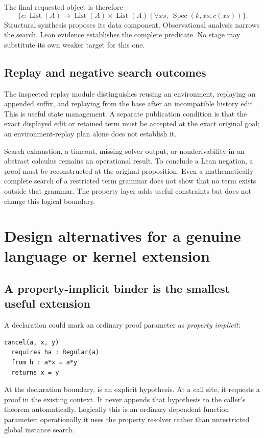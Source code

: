 \documentclass[11pt,a4paper]{article}
\newcommand{\code}[1]{\texttt{\detokenize{#1}}}
\newcommand{\Spec}{\operatorname{Spec}}
\theoremstyle{plain}
\theoremstyle{definition}
\begin{document}
The final requested object is therefore
\[
 \{c:\operatorname{List}(A)\to
       \operatorname{List}(A)\times\operatorname{List}(A)
     \mid \forall xs,\ \Spec(k,xs,c(xs))\}.
\]
Structural synthesis proposes its data component. Observational analysis narrows the search. Lean evidence establishes the complete predicate. No stage may substitute its own weaker target for this one.

\subsection{Replay and negative search outcomes}
The inspected replay module distinguishes reusing an environment, replaying an appended suffix, and replaying from the base after an incompatible history edit \cite{leant-replay}. This is useful state management. A separate publication condition is that the exact displayed edit or retained term must be accepted at the exact original goal; an environment-replay plan alone does not establish it.

Search exhaustion, a timeout, missing solver output, or nonderivability in an abstract calculus remains an operational result. To conclude a Lean negation, a proof must be reconstructed at the original proposition. Even a mathematically complete search of a restricted term grammar does not show that no term exists outside that grammar. The property layer adds useful constraints but does not change this logical boundary.

\section{Design alternatives for a genuine language or kernel extension}\label{sec:extensions}

\subsection{A property-implicit binder is the smallest useful extension}
A declaration could mark an ordinary proof parameter as \emph{property implicit}:
\par\noindent\begin{minipage}{\linewidth}
\begin{lstlisting}
cancel(a, x, y)
  requires ha : Regular(a)
  from h : a*x = a*y
  returns x = y
\end{lstlisting}
\end{minipage}\par
At the declaration boundary, \code{requires} is an explicit hypothesis. At a call site, it requests a proof in the existing context. It never appends that hypothesis to the caller's theorem automatically. Logically this is an ordinary dependent function parameter; operationally it uses the property resolver rather than unrestricted global instance search.
\end{document}
